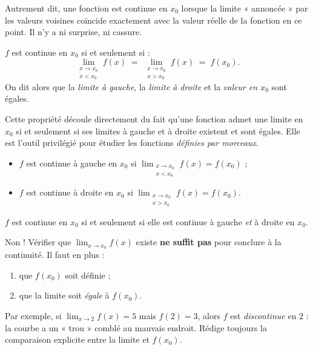 \documentclass[11pt]{article}
\newcommand{\cle}[1]{{\popxbold\color{popdark}#1}}
\begin{document}
Autrement dit, une fonction est continue en $x_0$ lorsque la limite « annoncée » par les valeurs voisines coïncide exactement avec la valeur réelle de la fonction en ce point. Il n'y a ni surprise, ni cassure.

\begin{propriete}
$f$ est continue en $x_0$ si et seulement si :
\[
\lim_{\substack{x \to x_0 \\ x < x_0}} f(x) \;=\; \lim_{\substack{x \to x_0 \\ x > x_0}} f(x) \;=\; f(x_0).
\]
On dit alors que la \emph{limite à gauche}, la \emph{limite à droite} et la \emph{valeur en $x_0$} sont égales.
\end{propriete}

Cette propriété découle directement du fait qu'une fonction admet une limite en $x_0$ si et seulement si ses limites à gauche et à droite existent et sont égales. Elle est l'outil privilégié pour étudier les fonctions \emph{définies par morceaux}.

\begin{definition}
\begin{itemize}
\item $f$ est \cle{continue à gauche} en $x_0$ si $\displaystyle\lim_{\substack{x \to x_0 \\ x < x_0}} f(x) = f(x_0)$ ;
\item $f$ est \cle{continue à droite} en $x_0$ si $\displaystyle\lim_{\substack{x \to x_0 \\ x > x_0}} f(x) = f(x_0)$.
\end{itemize}
$f$ est continue en $x_0$ si et seulement si elle est continue à gauche \emph{et} à droite en $x_0$.
\end{definition}

\begin{attention}
Non ! Vérifier que $\displaystyle\lim_{x \to x_0} f(x)$ existe \textbf{ne suffit pas} pour conclure à la continuité. Il faut en plus :
\begin{enumerate}
\item que $f(x_0)$ soit définie ;
\item que la limite soit \emph{égale} à $f(x_0)$.
\end{enumerate}
Par exemple, si $\displaystyle\lim_{x \to 2} f(x) = 5$ mais $f(2) = 3$, alors $f$ est \emph{discontinue} en $2$ : la courbe a un « trou » comblé au mauvais endroit. Rédige toujours la comparaison explicite entre la limite et $f(x_0)$.
\end{attention}
\end{document}
